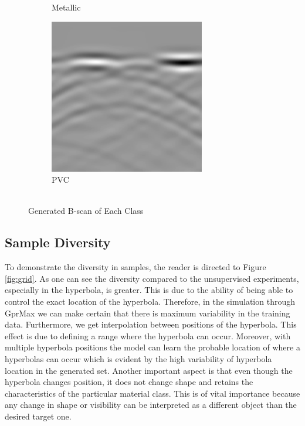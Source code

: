 \begin{figure}[H]
\begin{subfigure}[b]{0.4\linewidth}
    \caption{Metallic}
  \end{subfigure}
  \begin{subfigure}[b]{0.4\linewidth}
    \includegraphics[width=\linewidth]{figures/sample_bscan_pvc.png}
    \caption{PVC}
  \end{subfigure}
  \caption{\\Generated B-scan of Each Class}
  \label{fig:image_compare}
\end{figure}

\subsection{Sample Diversity}
\hspace{0.5in}To demonstrate the diversity in samples, the reader is directed to Figure \ref{fig:grid}. As one can see the diversity compared to the unsupervised experiments, especially in the hyperbola, is greater. This is due to the ability of being able to control the exact location of the hyperbola. Therefore, in the simulation through GprMax we can make certain that there is maximum variability in the training data. Furthermore, we get interpolation between positions of the hyperbola. This effect is due to defining a range where the hyperbola can occur. Moreover, with multiple hyperbola positions the model can learn the probable location of where a hyperbolas can occur which is evident by the high variability of hyperbola location in the generated set. Another important aspect is that even though the hyperbola changes position, it does not change shape and retains the characteristics of the particular material class. This is of vital importance because any change in shape or visibility can be interpreted as a different object than the desired target one.
\vspace{0.5\baselineskip}


